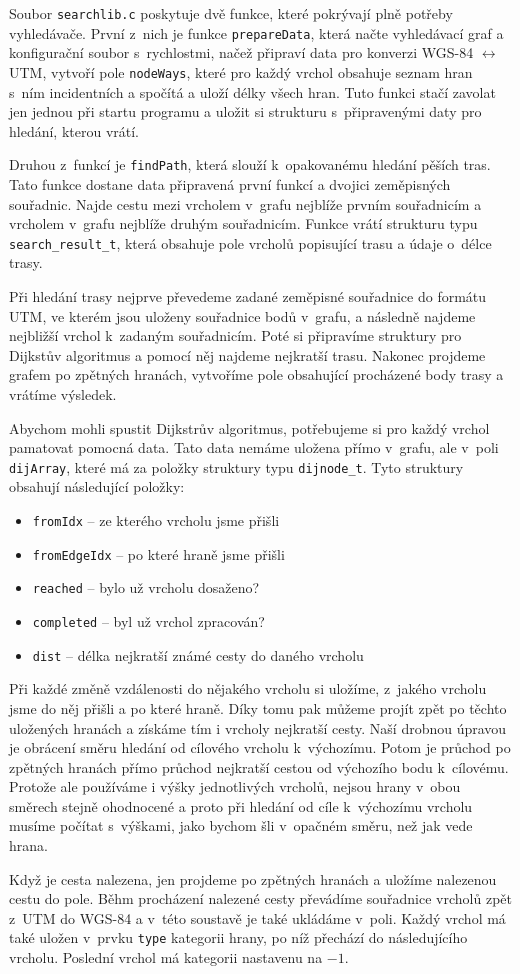 Soubor \verb|searchlib.c| poskytuje dvě funkce, které pokrývají plně potřeby
vyhledávače. První z~nich je funkce \verb|prepareData|, která načte vyhledávací
graf a konfigurační soubor s~rychlostmi, načež připraví data pro konverzi WGS-84
$\leftrightarrow$ UTM, vytvoří pole \verb|nodeWays|, které pro každý vrchol
obsahuje seznam hran s~ním incidentních a spočítá a uloží délky všech hran. Tuto
funkci stačí zavolat jen jednou při startu programu a uložit si strukturu
s~připravenými daty pro hledání, kterou vrátí.

Druhou z~funkcí je \verb|findPath|, která slouží k~opakovanému hledání pěších
tras. Tato funkce dostane data připravená první funkcí a dvojici zeměpisných
souřadnic. Najde cestu mezi vrcholem v~grafu nejblíže prvním souřadnicím a
vrcholem v~grafu nejblíže druhým souřadnicím. Funkce vrátí strukturu typu
\verb|search_result_t|, která obsahuje pole vrcholů popisující trasu a údaje o~délce
trasy.

Při hledání trasy nejprve převedeme zadané zeměpisné souřadnice do formátu UTM,
ve kterém jsou uloženy souřadnice bodů v~grafu, a následně najdeme nejbližší
vrchol k~zadaným souřadnicím. Poté si připravíme struktury pro Dijkstův
algoritmus a pomocí něj najdeme nejkratší trasu. Nakonec projdeme grafem po
zpětných hranách, vytvoříme pole obsahující procházené body trasy a vrátíme
výsledek.

Abychom mohli spustit Dijkstrův algoritmus, potřebujeme si pro každý vrchol
pamatovat pomocná data. Tato data nemáme uložena přímo v~grafu, ale v~poli
\verb|dijArray|, které má za položky struktury typu \verb|dijnode_t|. Tyto
struktury obsahují následující položky:
\begin{itemize}
	\item \verb|fromIdx| -- ze kterého vrcholu jsme přišli 
	\item \verb|fromEdgeIdx| -- po které hraně jsme přišli
	\item \verb|reached| -- bylo už vrcholu dosaženo? 
	\item \verb|completed| -- byl už vrchol zpracován?
	\item \verb|dist| -- délka nejkratší známé cesty do daného vrcholu
\end{itemize}

Při každé
změně vzdálenosti do nějakého vrcholu si uložíme, z~jakého vrcholu jsme do něj
přišli a po které hraně. Díky tomu pak můžeme projít zpět po těchto uložených
hranách a získáme tím i vrcholy nejkratší cesty. Naší drobnou úpravou je obrácení směru
hledání od cílového vrcholu k~výchozímu. Potom je průchod po zpětných hranách
přímo průchod nejkratší cestou od výchozího bodu k~cílovému. Protože ale
používáme i výšky jednotlivých vrcholů, nejsou hrany v~obou směrech stejně
ohodnocené a proto při hledání od cíle k~výchozímu vrcholu musíme počítat
s~výškami, jako bychom šli v~opačném směru, než jak vede hrana.

Když je cesta nalezena, jen projdeme po zpětných hranách a uložíme nalezenou
cestu do pole. Běhm procházení nalezené cesty převádíme souřadnice vrcholů zpět
z~UTM do WGS-84 a v~této soustavě je také ukládáme v~poli. Každý vrchol má také
uložen v~prvku \verb|type| kategorii hrany, po níž přechází do následujícího
vrcholu. Poslední vrchol má kategorii nastavenu na $-1$.
